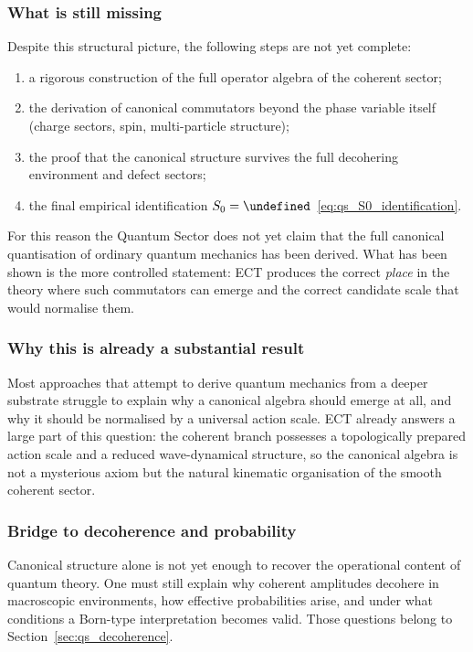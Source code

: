 \documentclass[11pt,a4paper]{article}
\let\hbar\undefined
\numberwithin{equation}{section}
\begin{document}
\subsubsection*{What is still missing}

Despite this structural picture, the following steps are not yet
complete:
\begin{enumerate}[label=(\roman*)]
  \item a rigorous construction of the full operator algebra of the
    coherent sector;
  \item the derivation of canonical commutators beyond the phase
    variable itself (charge sectors, spin, multi-particle structure);
  \item the proof that the canonical structure survives the full
    decohering environment and defect sectors;
  \item the final empirical identification
    $S_0=\hbar$~\eqref{eq:qs_S0_identification}.
\end{enumerate}
For this reason the Quantum Sector does not yet claim that the full
canonical quantisation of ordinary quantum mechanics has been derived.
What has been shown is the more controlled statement: ECT produces the
correct \emph{place} in the theory where such commutators can emerge and
the correct candidate scale that would normalise them.

\subsubsection*{Why this is already a substantial result}

Most approaches that attempt to derive quantum mechanics from a deeper
substrate struggle to explain why a canonical algebra should emerge at
all, and why it should be normalised by a universal action scale.
ECT already answers a large part of this question: the coherent branch
possesses a topologically prepared action scale and a reduced
wave-dynamical structure, so the canonical algebra is not a mysterious
axiom but the natural kinematic organisation of the smooth coherent
sector.

\subsubsection*{Bridge to decoherence and probability}

Canonical structure alone is not yet enough to recover the operational
content of quantum theory.
One must still explain why coherent amplitudes decohere in macroscopic
environments, how effective probabilities arise, and under what
conditions a Born-type interpretation becomes valid.
Those questions belong to Section~\ref{sec:qs_decoherence}.
\end{document}
